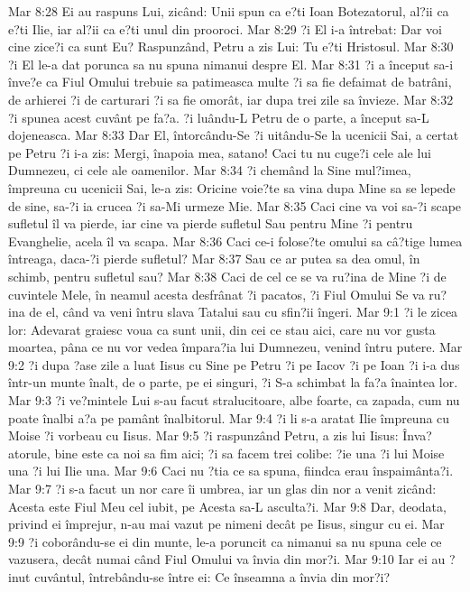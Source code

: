 Mar 8:28  Ei au raspuns Lui, zicând: Unii spun ca e?ti Ioan Botezatorul, al?ii ca e?ti Ilie, iar al?ii ca e?ti unul din prooroci.
Mar 8:29  ?i El i-a întrebat: Dar voi cine zice?i ca sunt Eu? Raspunzând, Petru a zis Lui: Tu e?ti Hristosul.
Mar 8:30  ?i El le-a dat porunca sa nu spuna nimanui despre El.
Mar 8:31  ?i a început sa-i înve?e ca Fiul Omului trebuie sa patimeasca multe ?i sa fie defaimat de batrâni, de arhierei ?i de carturari ?i sa fie omorât, iar dupa trei zile sa învieze.
Mar 8:32  ?i spunea acest cuvânt pe fa?a. ?i luându-L Petru de o parte, a început sa-L dojeneasca.
Mar 8:33  Dar El, întorcându-Se ?i uitându-Se la ucenicii Sai, a certat pe Petru ?i i-a zis: Mergi, înapoia mea, satano! Caci tu nu cuge?i cele ale lui Dumnezeu, ci cele ale oamenilor.
Mar 8:34  ?i chemând la Sine mul?imea, împreuna cu ucenicii Sai, le-a zis: Oricine voie?te sa vina dupa Mine sa se lepede de sine, sa-?i ia crucea ?i sa-Mi urmeze Mie.
Mar 8:35  Caci cine va voi sa-?i scape sufletul îl va pierde, iar cine va pierde sufletul Sau pentru Mine ?i pentru Evanghelie, acela îl va scapa.
Mar 8:36  Caci ce-i folose?te omului sa câ?tige lumea întreaga, daca-?i pierde sufletul?
Mar 8:37  Sau ce ar putea sa dea omul, în schimb, pentru sufletul sau?
Mar 8:38  Caci de cel ce se va ru?ina de Mine ?i de cuvintele Mele, în neamul acesta desfrânat ?i pacatos, ?i Fiul Omului Se va ru?ina de el, când va veni întru slava Tatalui sau cu sfin?ii îngeri.
Mar 9:1  ?i le zicea lor: Adevarat graiesc voua ca sunt unii, din cei ce stau aici, care nu vor gusta moartea, pâna ce nu vor vedea împara?ia lui Dumnezeu, venind întru putere.
Mar 9:2  ?i dupa ?ase zile a luat Iisus cu Sine pe Petru ?i pe Iacov ?i pe Ioan ?i i-a dus într-un munte înalt, de o parte, pe ei singuri, ?i S-a schimbat la fa?a înaintea lor.
Mar 9:3  ?i ve?mintele Lui s-au facut stralucitoare, albe foarte, ca zapada, cum nu poate înalbi a?a pe pamânt înalbitorul.
Mar 9:4  ?i li s-a aratat Ilie împreuna cu Moise ?i vorbeau cu Iisus.
Mar 9:5  ?i raspunzând Petru, a zis lui Iisus: Înva?atorule, bine este ca noi sa fim aici; ?i sa facem trei colibe: ?ie una ?i lui Moise una ?i lui Ilie una.
Mar 9:6  Caci nu ?tia ce sa spuna, fiindca erau înspaimânta?i.
Mar 9:7  ?i s-a facut un nor care îi umbrea, iar un glas din nor a venit zicând: Acesta este Fiul Meu cel iubit, pe Acesta sa-L asculta?i.
Mar 9:8  Dar, deodata, privind ei împrejur, n-au mai vazut pe nimeni decât pe Iisus, singur cu ei.
Mar 9:9  ?i coborându-se ei din munte, le-a poruncit ca nimanui sa nu spuna cele ce vazusera, decât numai când Fiul Omului va învia din mor?i.
Mar 9:10  Iar ei au ?inut cuvântul, întrebându-se între ei: Ce înseamna a învia din mor?i?
